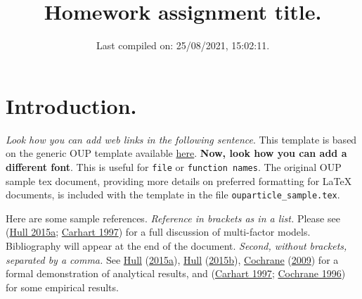 \documentclass[12pt,halfline,a4paper,]{ouparticle}
\begin{document}
\title{\textbf{Homework assignment title.}}

\author{%
%
\address{778899}
\and
{}\address{774455}
\and
{}\address{884422}
\and
{}
%
%
%
%
}


\date{Last compiled on: 25/08/2021, 15:02:11.}


\maketitle



\hypersetup{linkcolor=blue}

\hypertarget{introduction.}{%
\section{Introduction.}\label{introduction.}}

\emph{Look how you can add web links in the following sentence}. This
template is based on the generic OUP template available
\href{https://academic.oup.com/icesjms/pages/General_Instructions}{here}.
\textbf{Now, look how you can add a different font}. This is useful for
\texttt{file} or \texttt{function names}. The original OUP sample tex
document, providing more details on preferred formatting for LaTeX
documents, is included with the template in the file
\texttt{ouparticle\_sample.tex}.

Here are some sample references. \emph{Reference in brackets as in a
list.} Please see (\protect\hyperlink{ref-Hull}{Hull 2015a};
\protect\hyperlink{ref-carhart1997persistence}{Carhart 1997}) for a full
discussion of multi-factor models. Bibliography will appear at the end
of the document. \emph{Second, without brackets, separated by a comma.}
See \protect\hyperlink{ref-Hull}{Hull}
(\protect\hyperlink{ref-Hull}{2015a}),
\protect\hyperlink{ref-Hull2}{Hull}
(\protect\hyperlink{ref-Hull2}{2015b}),
\protect\hyperlink{ref-cochrane2009asset}{Cochrane}
(\protect\hyperlink{ref-cochrane2009asset}{2009}) for a formal
demonstration of analytical results, and
(\protect\hyperlink{ref-carhart1997persistence}{Carhart 1997};
\protect\hyperlink{ref-cochrane1996cross}{Cochrane 1996}) for some
empirical results.
\end{document}
